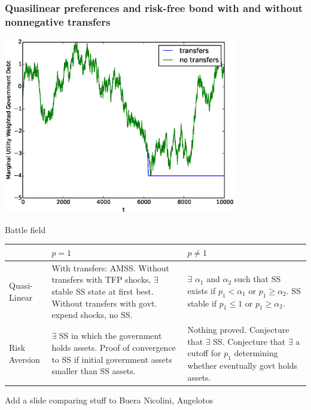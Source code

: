 \documentclass{beamer}
\begin{document}
 \begin{frame}
	\frametitle{Quasilinear preferences and risk-free bond  with and without nonnegative transfers}
	\begin{center}
	\includegraphics[width=4in]{Images/transfer_example2.eps}
	\end{center}
\end{frame}


\begin{frame}{Battle field}
\small
\begin{tabular}[h]{| l | p{1.25in} | p{1.25in} |}
	\hline
	&$p = 1$& $p\neq 1$\\
	\hline
	Quasi-Linear& With transfers: AMSS.  Without transfers with TFP shocks,  $\exists$ stable SS state at first best.  Without transfers with govt. expend shocks, no SS.& $\exists$   $\alpha_1$ and $\alpha_2$ such that SS exists if $p_1 < \alpha_1$ or $p_1 \geq\alpha_2$.  SS stable if $p_1 \leq 1$ or $p_1 \geq\alpha_2$.\\
	\hline
	Risk Aversion&$\exists$ SS in which the government holds assets.  Proof of convergence to SS if initial  government assets smaller than SS assets.& Nothing proved.  Conjecture that $\exists$ SS.  Conjecture that $\exists$ a cutoff for $p_1$ determining whether eventually govt holds assets.\\
	\hline
\end{tabular}

\end{frame}


\begin{frame}
 Add a slide comparing stuff to Buera Nicolini, Angelotos
\end{frame}
\end{document}
